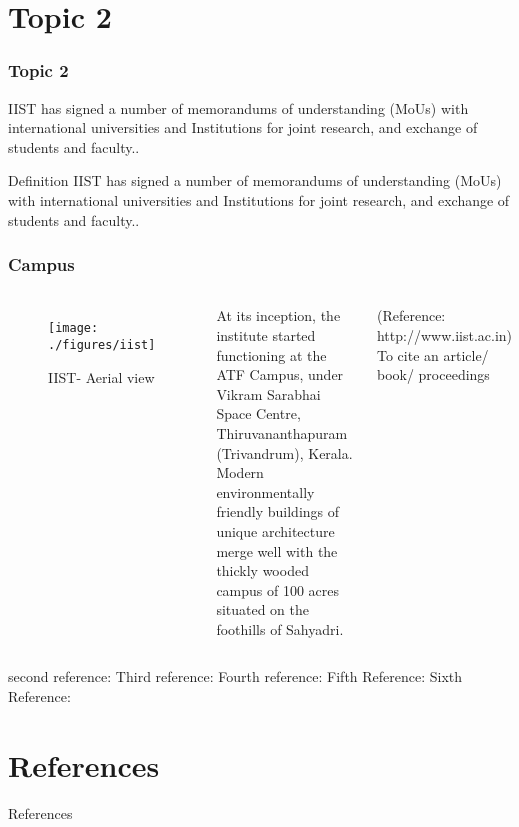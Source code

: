 \documentclass[hyperref={bookmarks=false},aspectratio=169]{beamer}
\begin{document}
\section{Topic 2}

\begin{frame}
\frametitle{Topic 2 }

IIST has signed a number of memorandums of understanding (MoUs) with international universities and Institutions for joint research, and exchange of  \alert{students and faculty.}.

\begin{block}{Definition}
IIST has signed a number of memorandums of understanding (MoUs) with international universities and Institutions for joint research, and exchange of  \alert{students and faculty.}.
\end{block}


\end{frame}


\begin{frame}
\frametitle{Campus}

\begin{columns}


\begin{figure}
    \centering
    \texttt{[image: ./figures/iist]}
    \caption{IIST- Aerial view}
    \label{fig:hollywood_prank}
\end{figure}


At its inception, the institute started functioning at the ATF Campus, under Vikram Sarabhai Space Centre, Thiruvananthapuram (Trivandrum), Kerala. Modern environmentally friendly buildings of unique architecture merge well with the thickly wooded campus of 100 acres situated on the foothills of Sahyadri.

\small{(Reference: http://www.iist.ac.in)}\\
To cite an article/ book/ proceedings


\end{columns}
\cite{santhosh2021generalized} second reference: \cite{ROMANO201714} Third reference:\cite{ROMANO2017151} Fourth reference: \cite{Strogatz1991} Fifth Reference: \cite{strogatz2004sync} Sixth Reference:\cite{thomson1996theory}
\end{frame}

\section{References}
\begin{frame}[allowframebreaks]{References}

	
	
	
\end{frame}
\end{document}
